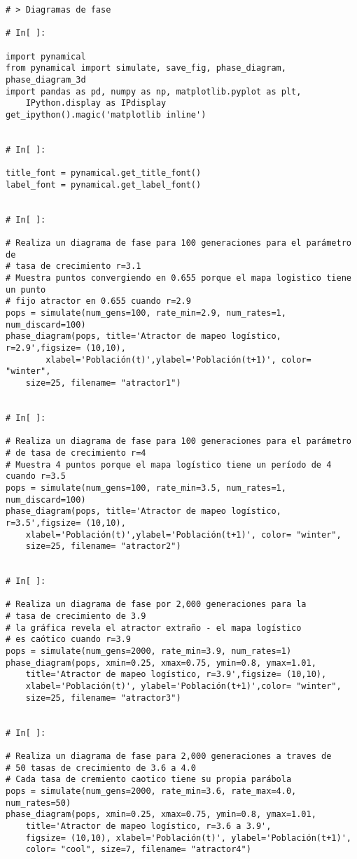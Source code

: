 \begin{verbatim}
# > Diagramas de fase

# In[ ]:

import pynamical
from pynamical import simulate, save_fig, phase_diagram, phase_diagram_3d
import pandas as pd, numpy as np, matplotlib.pyplot as plt, 
	IPython.display as IPdisplay
get_ipython().magic('matplotlib inline')


# In[ ]:

title_font = pynamical.get_title_font()
label_font = pynamical.get_label_font()


# In[ ]:

# Realiza un diagrama de fase para 100 generaciones para el parámetro de 
# tasa de crecimiento r=3.1
# Muestra puntos convergiendo en 0.655 porque el mapa logistico tiene un punto 
# fijo atractor en 0.655 cuando r=2.9
pops = simulate(num_gens=100, rate_min=2.9, num_rates=1, num_discard=100)
phase_diagram(pops, title='Atractor de mapeo logístico, r=2.9',figsize= (10,10), 
		xlabel='Población(t)',ylabel='Población(t+1)', color= "winter", 
    size=25, filename= "atractor1")


# In[ ]:

# Realiza un diagrama de fase para 100 generaciones para el parámetro 
# de tasa de crecimiento r=4
# Muestra 4 puntos porque el mapa logístico tiene un período de 4 cuando r=3.5
pops = simulate(num_gens=100, rate_min=3.5, num_rates=1, num_discard=100)
phase_diagram(pops, title='Atractor de mapeo logístico, r=3.5',figsize= (10,10), 
	xlabel='Población(t)',ylabel='Población(t+1)', color= "winter", 
    size=25, filename= "atractor2")


# In[ ]:

# Realiza un diagrama de fase por 2,000 generaciones para la 
# tasa de crecimiento de 3.9
# la gráfica revela el atractor extraño - el mapa logístico 
# es caótico cuando r=3.9
pops = simulate(num_gens=2000, rate_min=3.9, num_rates=1)
phase_diagram(pops, xmin=0.25, xmax=0.75, ymin=0.8, ymax=1.01,  
	title='Atractor de mapeo logístico, r=3.9',figsize= (10,10),
    xlabel='Población(t)', ylabel='Población(t+1)',color= "winter",
    size=25, filename= "atractor3")


# In[ ]:

# Realiza un diagrama de fase para 2,000 generaciones a traves de 
# 50 tasas de crecimiento de 3.6 a 4.0
# Cada tasa de cremiento caotico tiene su propia parábola
pops = simulate(num_gens=2000, rate_min=3.6, rate_max=4.0, num_rates=50)
phase_diagram(pops, xmin=0.25, xmax=0.75, ymin=0.8, ymax=1.01, 
	title='Atractor de mapeo logístico, r=3.6 a 3.9',
    figsize= (10,10), xlabel='Población(t)', ylabel='Población(t+1)',
    color= "cool", size=7, filename= "atractor4")



\end{verbatim}
